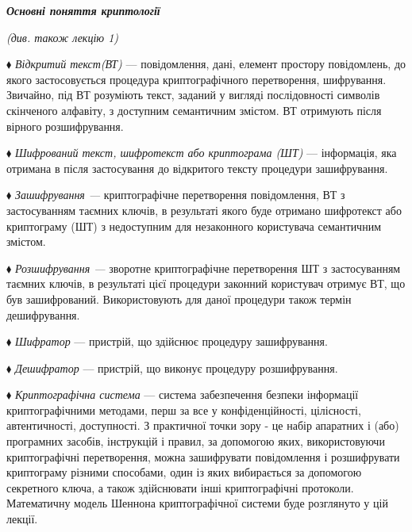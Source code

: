 \bigskip


\bigskip

{\centering\bfseries\itshape
Основні поняття криптології
\par}

{\centering\itshape
(див. також лекцію 1)
\par}


\bigskip


\bigskip

${\blacklozenge}$ \textit{Відкритий текст(ВТ)} --- повідомлення, дані, елемент
простору повідомлень, до якого застосовується процедура криптографічного
перетворення, шифрування. Звичайно, під ВТ розуміють текст, заданий у вигляді
послідовності символів скінченого алфавіту, з доступним семантичним змістом. ВТ
отримують після вірного розшифрування.

${\blacklozenge}$ \textit{Шифрований текст, шифротекст  або криптограма (ШТ)} ---
інформація, яка отримана в після застосування до відкритого тексту процедури
зашифрування.

${\blacklozenge}$ \textit{Зашифрування --- }криптографічне перетворення
повідомлення, ВТ з застосуванням таємних ключів, в результаті якого буде
отримано \textit{ }шифротекст  або криптограму (ШТ) з недоступним для
незаконного користувача семантичним змістом.

${\blacklozenge}$ \textit{Розшифрування --- }зворотне \textit{ }криптографічне
перетворення ШТ з застосуванням таємних ключів, в результаті цієї процедури
законний користувач отримує ВТ, що був зашифрований.  Використовують для даної
процедури також термін дешифрування.

${\blacklozenge}$ \textit{Шифратор }--- пристрій, що здійснює процедуру
зашифрування.

${\blacklozenge}$ \textit{Дешифратор }--- пристрій, що виконує процедуру
розшифрування.

${\blacklozenge}$ \textit{Криптографічна система }--- система забезпечення безпеки
інформації криптографічними методами, перш за все у конфіденційності,
цілісності, автентичності, доступності. З практичної точки зору -  це набір
апаратних і (або) програмних засобів, інструкцій і правил, за допомогою яких,
використовуючи криптографічні перетворення, можна зашифрувати  повідомлення і
розшифрувати криптограму різними способами, один із яких вибирається за
допомогою секретного ключа, а також здійснювати інші криптографічні протоколи.
Математичну модель Шеннона криптографічної системи буде розглянуто у цій
лекції.

